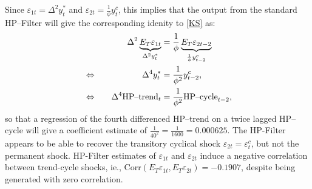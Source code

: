 \documentclass[a4paper,final,12pt]{article}
\begin{document}
Since $\varepsilon _{1t}=\Delta ^{2}y_{t}^{\ast }$ and $\varepsilon _{2t}=%
\frac{1}{\phi }y_{t}^{c}$, this implies that the output from the standard
HP--Filter will give the corresponding idenity to \ref{KS} as:%
\begin{alignat}{2}
& & \Delta ^{2}\underbrace{E_{T}\varepsilon _{1t}}_{\Delta ^{2}y_{t}^{\ast
}}& =\frac{1}{\phi }\underbrace{E_{T}\varepsilon _{2t-2}}_{\frac{1}{\phi }%
y_{t-2}^{c}}  \notag \\
& \Leftrightarrow  & \Delta ^{4}y_{t}^{\ast }& =\frac{1}{\phi ^{2}}%
y_{t-2}^{c},  \notag \\
& \Leftrightarrow ~~~ & \Delta ^{4}\text{HP--trend}_{t}& =\frac{1}{\phi ^{2}}%
\text{HP--cycle}_{t-2},  \notag
\end{alignat}%
so that a regression of the fourth differenced HP--trend on a twice lagged
HP--cycle will give a coefficient estimate of $\frac{1}{40^{2}}=\frac{1}{1600%
}=0.000625$. The HP-Filter appears to be able to recover the transitory
cyclical shock $\varepsilon _{2t}=\varepsilon _{t}^{c}$, but not the
permanent shock. HP-Filter estimates of $\varepsilon _{1t}$ and $\varepsilon
_{2t}$ induce a negative correlation between trend-cycle shocks, ie., $%
\mathrm{Corr}(E_{T}\varepsilon _{1t},E_{T}\varepsilon _{2t})=-0.1907$,
despite being generated with zero correlation.

\bigskip

\bigskip

\bigskip

\bigskip

\bigskip

\bigskip

\bigskip

\bigskip

\bigskip

\bigskip

\bigskip

\bigskip

\bigskip

\bigskip
\end{document}
